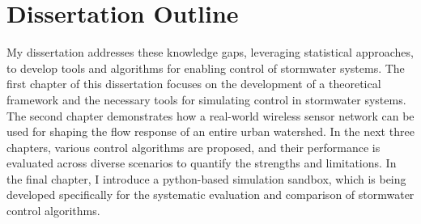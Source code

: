 \section{Dissertation Outline}
My dissertation addresses these knowledge gaps, leveraging statistical approaches, to develop tools and algorithms for enabling control of stormwater systems. 
The first chapter of this dissertation focuses on the development of a theoretical framework and the necessary tools for simulating control in stormwater systems. 
The second chapter demonstrates how a real-world wireless sensor network can be used for shaping the flow response of an entire urban watershed. 
In the next three chapters, various control algorithms are proposed, and their performance is evaluated across diverse scenarios to quantify the strengths and limitations.
In the final chapter, I introduce a python-based simulation sandbox, which is being developed specifically for the systematic evaluation and comparison of stormwater control algorithms.

